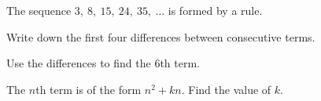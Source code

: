  The sequence $3,\ 8,\ 15,\ 24,\ 35,\ \ldots$ is formed by a rule.

\begin{subparts}
  \item Write down the first four differences between consecutive terms.
  \item Use the differences to find the 6th term.
  \item The $n$th term is of the form $n^2+kn$. Find the value of $k$.
\end{subparts}

